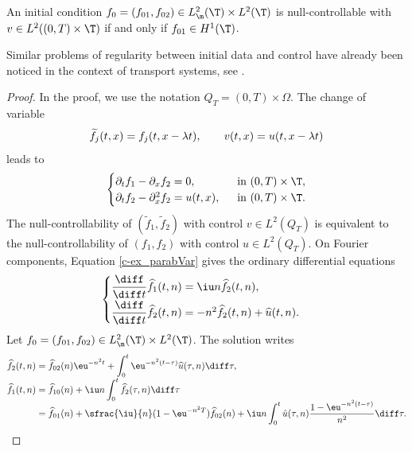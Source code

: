 \begin{prop}
An initial condition $f_0=(f_{01},f_{02}) \in L^2_\m(\T)\times L^2(\T)$
is null-controllable with $v \in L^2((0,T)\times\T)$ if and only if $f_{01} \in H^1(\T)$.
\end{prop}
\begin{remark}
Similar problems of regularity between initial data and control have already been noticed in the context of transport systems, see \cite[Rem.\,5]{alabau-boussouira_2017}.
\end{remark}
\begin{proof}
In the proof, we use the notation $Q_T = (0,T)\times\Omega$. The change of variable\vspace*{-3pt}
\[
\widetilde{f}_j(t,x)=f_j(t,x-\lambda t),\qquad v(t,x)=u(t,x-\lambda t)\vspace*{-3pt}
\]
leads to\vspace*{-3pt}
\begin{equation} \label{c-ex_parabVar}
\begin{cases}
\partial_t f_1 - \partial_x f_2 = 0, &\ \text{ in } (0,T)\times\T, \\
\partial_t f_2 - \partial_x^2 f_2 = u(t,x), &\ \text{ in } (0,T)\times\T.
\end{cases}
\end{equation}
The null-controllability of $(\widetilde{f}_1,\widetilde{f}_2)$ with control $v \in L^2(Q_T)$ is equivalent to the null-controllability of $(f_1,f_2)$ with control $u \in L^2(Q_T)$. On Fourier components, Equation \eqref{c-ex_parabVar} gives the ordinary differential equations
\begin{equation} \label{c-ex_parab2}
\begin{cases}
\dfrac{\diff}{\diff t} \widehat{f}_1(t,n) = \iu n \widehat{f}_2(t,n), \\[5pt]
\dfrac{\diff}{\diff t} \widehat{f}_2(t,n)=-n^2 \widehat{f}_2(t,n) + \widehat{u}(t,n).
\end{cases}
\end{equation}
Let $f_0=(f_{01},f_{02}) \in L_{\m}^2(\T) \times L^2(\T)$. The solution writes\vspace*{-3pt}
\begin{align*}
\widehat{f}_2(t,n)&=\widehat{f}_{02}(n) \eu^{-n^2 t} + \int_0^t \eu^{-n^2(t-\tau)}\widehat{u}(\tau,n) \diff\tau,\\[-3pt]
\widehat{f}_1(t,n)
& =\widehat{f}_{10}(n) + \iu n \int_0^t \widehat{f}_2(\tau,n) \diff \tau \\[-5pt]
& = \widehat{f}_{01}(n) + \sfrac{\iu}{n}(1-\eu^{-n^2 T})\widehat{f}_{02}(n) + \iu n \int_0^t \hat u(\tau,n) \frac{1-\eu^{-n^2(t-\tau)}}{n^2} \diff\tau.

\end{align*}
\end{proof}

